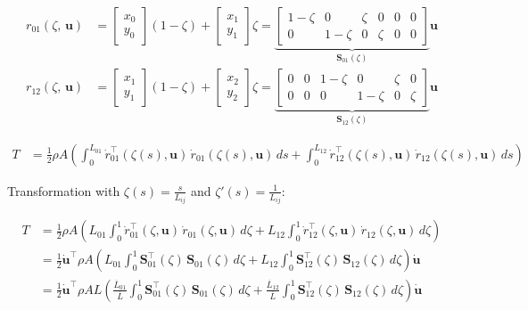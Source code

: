 \begin{align*}
r_{01}(\zeta,\,\boldsymbol{u}) &= \begin{bmatrix} x_0 \\ y_0 \end{bmatrix}(1 - \zeta) + \begin{bmatrix} x_1 \\ y_1 \end{bmatrix} \zeta
=
\underbrace{
\begin{bmatrix}
1 - \zeta & 0 & \zeta & 0 & 0 & 0\\
0 & 1 - \zeta & 0 & \zeta & 0 & 0
\end{bmatrix}
}_{\boldsymbol{S}_{01}(\zeta)}
\boldsymbol{u} \\
r_{12}(\zeta,\,\boldsymbol{u}) &= \begin{bmatrix} x_1 \\ y_1 \end{bmatrix}(1 - \zeta) + \begin{bmatrix} x_2 \\ y_2 \end{bmatrix} \zeta
=
\underbrace{
\begin{bmatrix}
0 & 0 & 1 - \zeta & 0 & \zeta & 0 \\
0 & 0 & 0 & 1 - \zeta & 0 & \zeta
\end{bmatrix}
}_{\boldsymbol{S}_{12}(\zeta)}
\boldsymbol{u}
\end{align*}

\begin{align*}
T &= \frac{1}{2}\rho A  \left( \int_{0}^{L_{01}} \dot{r}_{01}^\intercal(\zeta(s), \boldsymbol{u})\,\dot{r}_{01}(\zeta(s), \boldsymbol{u})\,ds + \int_{0}^{L_{12}} \dot{r}^\intercal_{12}(\zeta(s), \boldsymbol{u})\,\dot{r}_{12}(\zeta(s), \boldsymbol{u})\,ds \right)
\end{align*}

Transformation with $\zeta(s) = \frac{s}{L_{ij}}$ and $\zeta'(s) = \frac{1}{L_{ij}}$:

\begin{align*}
T &= \frac{1}{2}\rho A  \left( L_{01} \int_{0}^{1} \dot{r}_{01}^\intercal(\zeta, \boldsymbol{u})\,\dot{r}_{01}(\zeta, \boldsymbol{u})\,d\zeta + L_{12} \int_{0}^{1} \dot{r}^\intercal_{12}(\zeta, \boldsymbol{u})\,\dot{r}_{12}(\zeta, \boldsymbol{u})\,d\zeta \right) \\
&= \frac{1}{2} \dot{\boldsymbol{u}}^\intercal \rho A \left( L_{01} \int_{0}^{1} \boldsymbol{S}_{01}^\intercal(\zeta)\,\boldsymbol{S}_{01}(\zeta)\,d\zeta +  L_{12} \int_{0}^{1} \boldsymbol{S}^\intercal_{12}(\zeta)\,\boldsymbol{S}_{12}(\zeta)\,d\zeta \right) \dot{\boldsymbol{u}} \\
&= \frac{1}{2} \dot{\boldsymbol{u}}^\intercal \rho A L \left( \frac{\overline{L}_{01}}{\overline{L}} \int_{0}^{1} \boldsymbol{S}_{01}^\intercal(\zeta)\,\boldsymbol{S}_{01}(\zeta)\,d\zeta + \frac{\overline{L}_{12}}{\overline{L}} \int_{0}^{1} \boldsymbol{S}^\intercal_{12}(\zeta)\,\boldsymbol{S}_{12}(\zeta)\,d\zeta \right) \dot{\boldsymbol{u}}
\end{align*}

